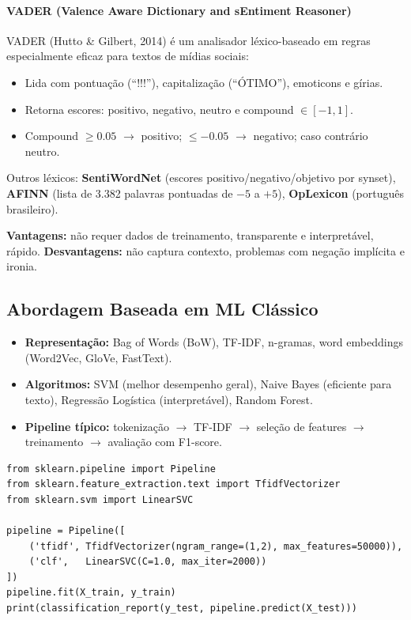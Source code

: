 \documentclass[12pt,a4paper]{article}
\begin{document}
\paragraph{VADER (Valence Aware Dictionary and sEntiment Reasoner)}

VADER (Hutto \& Gilbert, 2014) é um analisador léxico-baseado em regras especialmente eficaz para textos de mídias sociais:
\begin{itemize}
  \item Lida com pontuação (``!!!''), capitalização (``ÓTIMO''), emoticons e gírias.
  \item Retorna escores: positivo, negativo, neutro e compound $\in [-1, 1]$.
  \item Compound $\geq 0.05$ $\to$ positivo; $\leq -0.05$ $\to$ negativo; caso contrário neutro.
\end{itemize}

Outros léxicos: \textbf{SentiWordNet} (escores positivo/negativo/objetivo por synset), \textbf{AFINN} (lista de 3.382 palavras pontuadas de $-5$ a $+5$), \textbf{OpLexicon} (português brasileiro).

\textbf{Vantagens:} não requer dados de treinamento, transparente e interpretável, rápido.
\textbf{Desvantagens:} não captura contexto, problemas com negação implícita e ironia.

\subsection{Abordagem Baseada em ML Clássico}

\begin{itemize}
  \item \textbf{Representação:} Bag of Words (BoW), TF-IDF, n-gramas, word embeddings (Word2Vec, GloVe, FastText).
  \item \textbf{Algoritmos:} SVM (melhor desempenho geral), Naive Bayes (eficiente para texto), Regressão Logística (interpretável), Random Forest.
  \item \textbf{Pipeline típico:} tokenização $\to$ TF-IDF $\to$ seleção de features $\to$ treinamento $\to$ avaliação com F1-score.
\end{itemize}

\begin{lstlisting}[caption={Pipeline de SA com TF-IDF e SVM}]
from sklearn.pipeline import Pipeline
from sklearn.feature_extraction.text import TfidfVectorizer
from sklearn.svm import LinearSVC

pipeline = Pipeline([
    ('tfidf', TfidfVectorizer(ngram_range=(1,2), max_features=50000)),
    ('clf',   LinearSVC(C=1.0, max_iter=2000))
])
pipeline.fit(X_train, y_train)
print(classification_report(y_test, pipeline.predict(X_test)))
\end{lstlisting}
\end{document}
